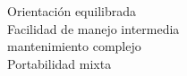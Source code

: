 \documentclass[preview]{standalone}
\begin{document}
Orientación equilibrada\\Facilidad de manejo intermedia\\mantenimiento complejo\\Portabilidad mixta\\
\end{document}
